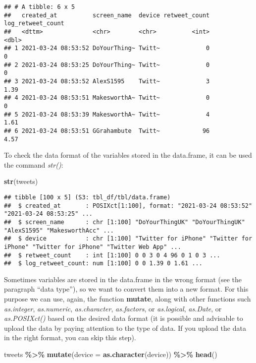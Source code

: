 \documentclass[
]{article}
\newenvironment{Shaded}{\begin{snugshade}}{\end{snugshade}}
\newcommand{\AttributeTok}[1]{\textcolor[rgb]{0.13,0.29,0.53}{#1}}
\newcommand{\FunctionTok}[1]{\textcolor[rgb]{0.13,0.29,0.53}{\textbf{#1}}}
\newcommand{\NormalTok}[1]{#1}
\newcommand{\SpecialCharTok}[1]{\textcolor[rgb]{0.81,0.36,0.00}{\textbf{#1}}}
\begin{document}
\begin{verbatim}
## # A tibble: 6 x 5
##   created_at          screen_name  device retweet_count log_retweet_count
##   <dttm>              <chr>        <chr>          <int>             <dbl>
## 1 2021-03-24 08:53:52 DoYourThing~ Twitt~             0              0   
## 2 2021-03-24 08:53:25 DoYourThing~ Twitt~             0              0   
## 3 2021-03-24 08:53:52 AlexS1595    Twitt~             3              1.39
## 4 2021-03-24 08:53:51 MakesworthA~ Twitt~             0              0   
## 5 2021-03-24 08:53:39 MakesworthA~ Twitt~             4              1.61
## 6 2021-03-24 08:53:51 GGrahambute  Twitt~            96              4.57
\end{verbatim}

To check the data format of the variables stored in the data.frame, it can be used the command \emph{str()}:

\begin{Shaded}
\begin{Highlighting}[]
\FunctionTok{str}\NormalTok{(tweets)}
\end{Highlighting}
\end{Shaded}

\begin{verbatim}
## tibble [100 x 5] (S3: tbl_df/tbl/data.frame)
##  $ created_at       : POSIXct[1:100], format: "2021-03-24 08:53:52" "2021-03-24 08:53:25" ...
##  $ screen_name      : chr [1:100] "DoYourThingUK" "DoYourThingUK" "AlexS1595" "MakesworthAcc" ...
##  $ device           : chr [1:100] "Twitter for iPhone" "Twitter for iPhone" "Twitter for iPhone" "Twitter Web App" ...
##  $ retweet_count    : int [1:100] 0 0 3 0 4 96 0 1 0 3 ...
##  $ log_retweet_count: num [1:100] 0 0 1.39 0 1.61 ...
\end{verbatim}

Sometimes variables are stored in the data.frame in the wrong format (see the paragraph ``data type''), so we want to convert them into a new format. For this purpose we can use, again, the function \textbf{mutate}, along with other functions such \emph{as.integer}, \emph{as.numeric}, \emph{as.character}, \emph{as.factors}, or \emph{as.logical}, \emph{as.Date}, or \emph{as.POSIXct()} based on the desired data format (it is possible and advisable to upload the data by paying attention to the type of data. If you upload the data in the right format, you can skip this step).

\begin{Shaded}
\begin{Highlighting}[]
\NormalTok{tweets }\SpecialCharTok{\%\textgreater{}\%}
  \FunctionTok{mutate}\NormalTok{(}\AttributeTok{device =} \FunctionTok{as.character}\NormalTok{(device)) }\SpecialCharTok{\%\textgreater{}\%}
  \FunctionTok{head}\NormalTok{()}
\end{Highlighting}
\end{Shaded}
\end{document}
